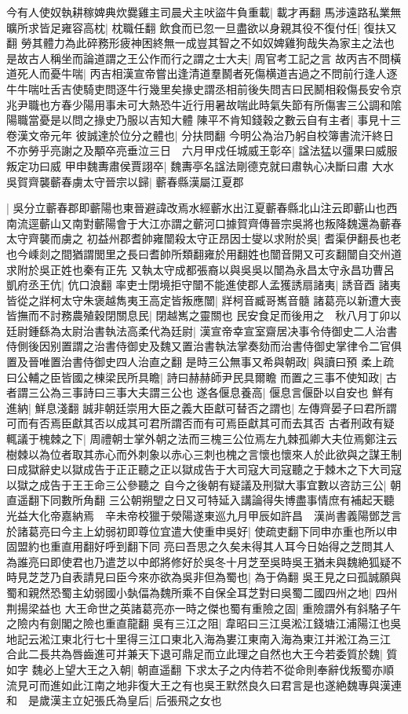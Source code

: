 今有人使奴執耕稼婢典炊爨雞主司晨犬主吠盜牛負重載|{
	載才再翻}
馬涉遠路私業無曠所求皆足雍容高枕|{
	枕職任翻}
飲食而已忽一旦盡欲以身親其役不復付任|{
	復扶又翻}
勞其體力為此碎務形疲神困終無一成豈其智之不如奴婢雞狗哉失為家主之法也是故古人稱坐而論道謂之王公作而行之謂之士大夫|{
	周官考工記之言}
故丙吉不問橫道死人而憂牛喘|{
	丙吉相漢宣帝嘗出逢清道羣鬭者死傷横道吉過之不問前行逢人逐牛牛喘吐舌吉使騎吏問逐牛行幾里矣掾史謂丞相前後失問吉曰民鬭相殺傷長安令京兆尹職也方春少陽用事未可大熱恐牛近行用暑故喘此時氣失節有所傷害三公調和隂陽職當憂是以問之掾史乃服以吉知大體}
陳平不肯知錢穀之數云自有主者|{
	事見十三卷漢文帝元年}
彼誠達於位分之體也|{
	分扶問翻}
今明公為治乃躬自校簿書流汗終日不亦勞乎亮謝之及顒卒亮垂泣三日　六月甲戍任城威王彰卒|{
	諡法猛以彊果曰威服叛定功曰威}
甲申魏夀肅侯賈詡卒|{
	魏夀亭名諡法剛德克就曰肅執心决斷曰肅}
大水　吳賀齊襲蘄春虜太守晉宗以歸|{
	蘄春縣漢屬江夏郡}


|{
	吳分立蘄春郡即蘄陽也東晉避諱改焉水經蘄水出江夏蘄春縣北山注云即蘄山也西南流逕蘄山又南對蘄陽會于大江亦謂之蘄河口據賀齊傳晉宗吳將也叛降魏還為蘄春太守齊襲而虜之}
初益州郡耆帥雍闓殺太守正昂因士燮以求附於吳|{
	耆渠伊翻長也老也今嵊剡之間猶謂閭里之長曰耆帥所類翻雍於用翻姓也闓音開又可亥翻闓自交州道求附於吳正姓也秦有正先}
又執太守成都張裔以與吳吳以闓為永昌太守永昌功曹呂凱府丞王伉|{
	伉口浪翻}
率吏士閉境拒守闓不能進使郡人孟獲誘扇諸夷|{
	誘音酉}
諸夷皆從之牂柯太守朱褒越雋夷王高定皆叛應闓|{
	牂柯音臧哥嶲音髓}
諸葛亮以新遭大喪皆撫而不討務農殖穀閉關息民|{
	閉越嶲之靈關也}
民安食足而後用之　秋八月丁卯以廷尉鍾繇為太尉治書執法高柔代為廷尉|{
	漢宣帝幸宣室齋居决事令侍御史二人治書侍側後因别置謂之治書侍御史及魏又置治書執法掌奏劾而治書侍御史掌律令二官俱置及晉唯置治書侍御史四人治直之翻}
是時三公無事又希與朝政|{
	與讀曰預}
柔上疏曰公輔之臣皆國之棟梁民所具瞻|{
	詩曰赫赫師尹民具爾瞻}
而置之三事不使知政|{
	古者謂三公為三事詩曰三事大夫謂三公也}
遂各偃息養高|{
	偃息言偃卧以自安也}
鮮有進納|{
	鮮息淺翻}
誠非朝廷崇用大臣之義大臣獻可替否之謂也|{
	左傳齊晏子曰君所謂可而有否焉臣獻其否以成其可君所謂否而有可焉臣獻其可而去其否}
古者刑政有疑輒議于槐棘之下|{
	周禮朝士掌外朝之法而三槐三公位焉左九棘孤卿大夫位焉鄭注云樹棘以為位者取其赤心而外刺象以赤心三刺也槐之言懷也懷來人於此欲與之謀王制曰成獄辭史以獄成告于正正聽之正以獄成告于大司寇大司寇聽之于棘木之下大司寇以獄之成告于王王命三公參聽之}
自今之後朝有疑議及刑獄大事宜數以咨訪三公|{
	朝直遥翻下同數所角翻}
三公朝朔朢之日又可特延入講論得失博盡事情庶有補起天聽光益大化帝嘉納焉　辛未帝校獵于滎陽遂東巡九月甲辰如許昌　漢尚書義陽鄧芝言於諸葛亮曰今主上幼弱初即尊位宜遣大使重申吳好|{
	使疏吏翻下同申亦重也所以申固盟約也重直用翻好呼到翻下同}
亮曰吾思之久矣未得其人耳今日始得之芝問其人為誰亮曰即使君也乃遣芝以中郎將修好於吳冬十月芝至吳時吳王猶未與魏絶狐疑不時見芝芝乃自表請見曰臣今來亦欲為吳非但為蜀也|{
	為于偽翻}
吳王見之曰孤誠願與蜀和親然恐蜀主幼弱國小埶偪為魏所乘不自保全耳芝對曰吳蜀二國四州之地|{
	四州荆揚梁益也}
大王命世之英諸葛亮亦一時之傑也蜀有重險之固|{
	重險謂外有斜駱子午之險内有劍閣之險也重直龍翻}
吳有三江之阻|{
	韋昭曰三江吳淞江錢塘江浦陽江也吳地記云淞江東北行七十里得三江口東北入海為婁江東南入海為東江并淞江為三江}
合此二長共為唇齒進可并兼天下退可鼎足而立此理之自然也大王今若委質於魏|{
	質如字}
魏必上望大王之入朝|{
	朝直遥翻}
下求太子之内侍若不從命則奉辭伐叛蜀亦順流見可而進如此江南之地非復大王之有也吳王默然良久曰君言是也遂絶魏專與漢連和　是歲漢主立妃張氏為皇后|{
	后張飛之女也}


